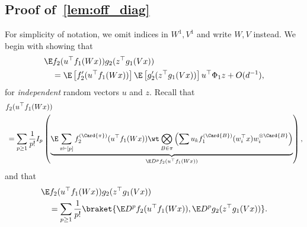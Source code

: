 
\subsection{Proof of~\cref{lem:off_diag}}
For simplicity of notation, we omit indices in \(W^1, V^1\) and write \(W, V\) instead. We begin with showing that
    \begin{equation}
        \begin{aligned}
        &\E f_2(u^{\top} f_1(Wx)) g_2(z^{\top} g_1(Vx)) \\
        &\quad = \E \left[f_2' (u^\top f_1(Wx))\right] \E \left[g_2' (z^\top g_1(Vx))\right]  u^\top \Phi_1 z + O(d^{-1}),
        \end{aligned}
    \end{equation}
for \emph{independent} random vectors \(u\) and \(z\).
Recall that 
\begin{equation}
    \begin{aligned}
    &f_2(u^\top f_1(Wx)) \\
    &\, = \sum_{p \geq 1} \frac{1}{p!} I_p \left(\underbrace{\E \sum_{\pi \vdash[p]} f_2^{(\Card{\pi})} (u^\top f_1(Wx)) \wt \bigotimes_{B \in \pi} \left(\sum u_k f_1^{(\Card{B})}(w_i^\top x) w_i^{\otimes \Card{B}}\right)}_{\E D^p f_2(u^\top f_1(Wx))}\right),
    \end{aligned}
\end{equation}
and that 
\begin{align*}
&\E f_2(u^{\top} f_1(Wx))g_2(z^{\top} g_1(Vx)) \\
&\quad = \sum_{p \geq 1} \frac{1}{p!} \braket{\E D^p f_2(u^{\top} f_1(Wx)), \E D^p g_2(z^{\top} g_1(Vx))}.
\end{align*}

